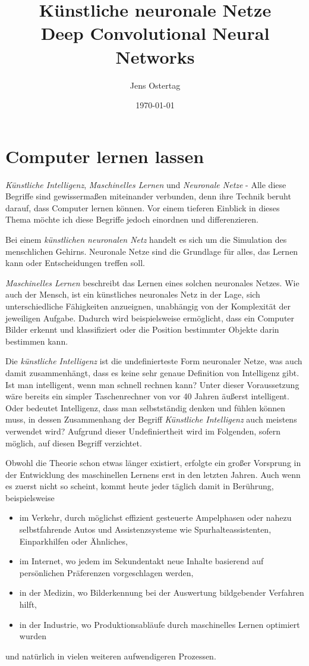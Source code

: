 \documentclass[12pt,a4]{article}
\title{\textbf{Künstliche neuronale Netze\\Deep Convolutional Neural Networks}}
\author{Jens Ostertag}
\date{\today}
\begin{document}
\maketitle
\tableofcontents
\clearpage
\section{Computer lernen lassen}\label{sec:Introduction}
\textit{Künstliche Intelligenz}, \textit{Maschinelles Lernen} und \textit{Neuronale Netze} - Alle diese Begriffe sind gewissermaßen miteinander verbunden, denn ihre Technik beruht darauf, dass Computer lernen können. Vor einem tieferen Einblick in dieses Thema möchte ich diese Begriffe jedoch einordnen und differenzieren.

Bei einem \textit{künstlichen neuronalen Netz} handelt es sich um die Simulation des menschlichen Gehirns. Neuronale Netze sind die Grundlage für alles, das Lernen kann oder Entscheidungen treffen soll.

\textit{Maschinelles Lernen} beschreibt das Lernen eines solchen neuronales Netzes. Wie auch der Mensch, ist ein künstliches neuronales Netz in der Lage, sich unterschiedliche Fähigkeiten anzueignen, unabhängig von der Komplexität der jeweiligen Aufgabe. Dadurch wird beispielsweise ermöglicht, dass ein Computer Bilder erkennt und klassifiziert oder die Position bestimmter Objekte darin bestimmen kann.

Die \textit{künstliche Intelligenz} ist die undefinierteste Form neuronaler Netze, was auch damit zusammenhängt, dass es keine sehr genaue Definition von Intelligenz gibt. Ist man intelligent, wenn man schnell rechnen kann? Unter dieser Voraussetzung wäre bereits ein simpler Taschenrechner von vor 40 Jahren äußerst intelligent. Oder bedeutet Intelligenz, dass man selbstständig denken und fühlen können muss, in dessen Zusammenhang der Begriff \textit{Künstliche Intelligenz} auch meistens verwendet wird?
Aufgrund dieser Undefiniertheit wird im Folgenden, sofern möglich, auf diesen Begriff verzichtet.

Obwohl die Theorie schon etwas länger existiert, erfolgte ein großer Vorsprung in der Entwicklung des maschinellen Lernens erst in den letzten Jahren. Auch wenn es zuerst nicht so scheint, kommt heute jeder täglich damit in Berührung, beispielsweise
\begin{itemize}
\item im Verkehr, durch möglichst effizient gesteuerte Ampelphasen oder nahezu selbstfahrende Autos und Assistenzsysteme wie Spurhalteassistenten, Einparkhilfen oder Ähnliches,
\item im Internet, wo jedem im Sekundentakt neue Inhalte basierend auf persönlichen Präferenzen vorgeschlagen werden,
\item in der Medizin, wo Bilderkennung bei der Auswertung bildgebender Verfahren hilft,
\item in der Industrie, wo Produktionsabläufe durch maschinelles Lernen optimiert wurden
\end{itemize}
und natürlich in vielen weiteren aufwendigeren Prozessen.
\end{document}
